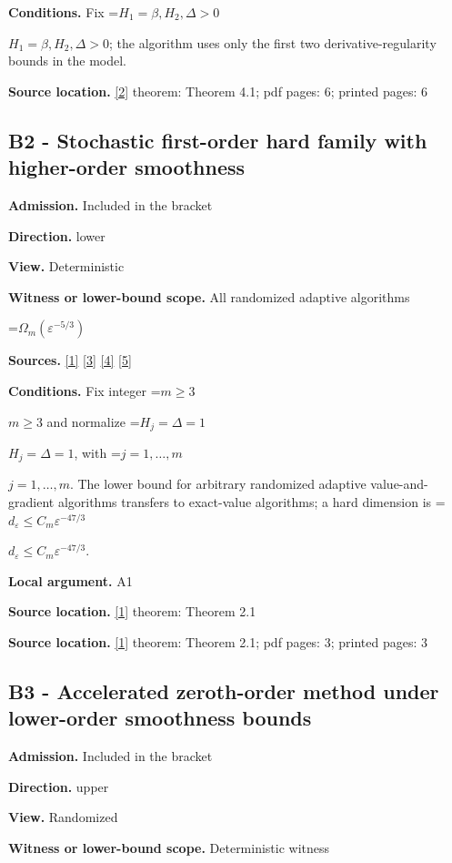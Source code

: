 \documentclass[10pt,a4paper]{article}
\newcommand{\AtlasMath}[1]{\par\begingroup\centering\setbox0=\hbox{$\displaystyle #1$}\ifdim\wd0>1.4\linewidth\typeout{ATLAS WIDE FORMULA: \the\wd0}\fi\ifdim\wd0>\linewidth\resizebox{\linewidth}{!}{\box0}\else\box0\fi\par\endgroup}
\newcommand{\AtlasInlineMath}[1]{\begingroup\setbox0=\hbox{$#1$}\ifdim\wd0>.4\linewidth\endgroup\AtlasMath{#1}\else\endgroup$#1$\fi}
\begin{document}
\textbf{Conditions.} Fix \AtlasInlineMath{H_1=\beta,H_2,\Delta>0}; the algorithm uses only the first two derivative-regularity bounds in the model.

\textbf{Source location.} \href{https://proceedings.mlr.press/v235/he24h.html}{[2]} theorem: Theorem 4.1; pdf pages: 6; printed pages: 6

\subsection{B2 - Stochastic first-order hard family with higher-order smoothness}
\textbf{Admission.} Included in the bracket

\textbf{Direction.} lower

\textbf{View.} Deterministic

\textbf{Witness or lower-bound scope.} All randomized adaptive algorithms

\AtlasMath{\Omega_m(\varepsilon^{-5/3})}
\textbf{Sources.} \href{https://arxiv.org/html/2610.17074v1}{[1]} \href{https://arxiv.org/html/2610.19652v1}{[3]} \href{https://arxiv.org/html/2609.00045v3}{[4]} \href{https://arxiv.org/pdf/2610.00245v2}{[5]}

\textbf{Conditions.} Fix integer \AtlasInlineMath{m\ge3} and normalize \AtlasInlineMath{H_j=\Delta=1}, with \AtlasInlineMath{j=1,\ldots,m}. The lower bound for arbitrary randomized adaptive value-and-gradient algorithms transfers to exact-value algorithms; a hard dimension is \AtlasInlineMath{d_\varepsilon\le C_m\varepsilon^{-47/3}}.

\textbf{Local argument.} A1

\textbf{Source location.} \href{https://arxiv.org/html/2610.17074v1}{[1]} theorem: Theorem 2.1

\textbf{Source location.} \href{https://arxiv.org/html/2610.17074v1}{[1]} theorem: Theorem 2.1; pdf pages: 3; printed pages: 3

\subsection{B3 - Accelerated zeroth-order method under lower-order smoothness bounds}
\textbf{Admission.} Included in the bracket

\textbf{Direction.} upper

\textbf{View.} Randomized

\textbf{Witness or lower-bound scope.} Deterministic witness
\end{document}
